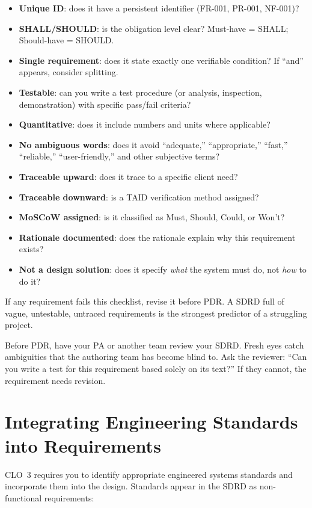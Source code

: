 \begin{itemize}[nosep,leftmargin=1.5em]
\item \textbf{Unique ID}: does it have a persistent identifier (FR-001, PR-001, NF-001)?
\item \textbf{SHALL/SHOULD}: is the obligation level clear? Must-have = SHALL; Should-have = SHOULD.
\item \textbf{Single requirement}: does it state exactly one verifiable condition? If ``and'' appears, consider splitting.
\item \textbf{Testable}: can you write a test procedure (or analysis, inspection, demonstration) with specific pass/fail criteria?
\item \textbf{Quantitative}: does it include numbers and units where applicable?
\item \textbf{No ambiguous words}: does it avoid ``adequate,'' ``appropriate,'' ``fast,'' ``reliable,'' ``user-friendly,'' and other subjective terms?
\item \textbf{Traceable upward}: does it trace to a specific client need?
\item \textbf{Traceable downward}: is a TAID verification method assigned?
\item \textbf{MoSCoW assigned}: is it classified as Must, Should, Could, or Won't?
\item \textbf{Rationale documented}: does the rationale explain why this requirement exists?
\item \textbf{Not a design solution}: does it specify \emph{what} the system must do, not \emph{how} to do it?
\end{itemize}

If any requirement fails this checklist, revise it before PDR. A SDRD full of vague, untestable, untraced requirements is the strongest predictor of a struggling project.

\begin{tipbox}
Before PDR, have your PA or another team review your SDRD. Fresh eyes catch ambiguities that the authoring team has become blind to. Ask the reviewer: ``Can you write a test for this requirement based solely on its text?'' If they cannot, the requirement needs revision.
\end{tipbox}


\section{Integrating Engineering Standards into Requirements}
CLO~3 requires you to identify appropriate engineered systems standards and incorporate them into the design. Standards appear in the SDRD as non-functional requirements:

